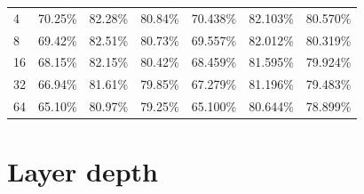 \begin{table}[h]
\begin{tabular}{lllllll}
4          & 70.25\%     & 82.28\%                                                                       & \multicolumn{1}{l|}{80.84\%}                                                                       & 70.438\%    & 82.103\%                                                                   & 80.570\%                                                                \\
8          & 69.42\%     & 82.51\%                                                                       & \multicolumn{1}{l|}{80.73\%}                                                                       & 69.557\%    & 82.012\%                                                                   & 80.319\%                                                                \\
16         & 68.15\%     & 82.15\%                                                                       & \multicolumn{1}{l|}{80.42\%}                                                                       & 68.459\%    & 81.595\%                                                                   & 79.924\%                                                                \\
32         & 66.94\%     & 81.61\%                                                                       & \multicolumn{1}{l|}{79.85\%}                                                                       & 67.279\%    & 81.196\%                                                                   & 79.483\%                                                                \\
64         & 65.10\%     & 80.97\%                                                                       & \multicolumn{1}{l|}{79.25\%}                                                                       & 65.100\%    & 80.644\%                                                                   & 78.899\%                                                               
\end{tabular}
\end{table}

\section*{Layer depth}

